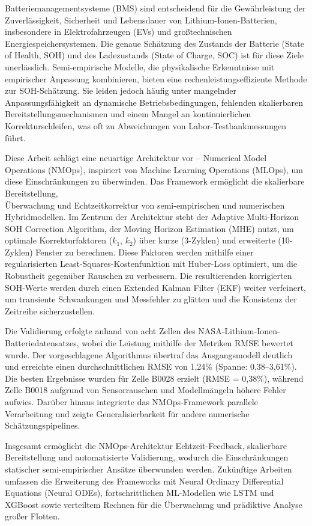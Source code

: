 

Batteriemanagementsysteme (BMS) sind entscheidend für die Gewährleistung der Zuverlässigkeit, Sicherheit und Lebensdauer von Lithium-Ionen-Batterien, insbesondere in Elektrofahrzeugen (EVs) und großtechnischen Energiespeichersystemen. Die genaue Schätzung des Zustands der Batterie (State of Health, SOH) und des Ladezustands (State of Charge, SOC) ist für diese Ziele unerlässlich. Semi-empirische Modelle, die physikalische Erkenntnisse mit empirischer Anpassung kombinieren, bieten eine rechenleistungseffiziente Methode zur SOH-Schätzung. Sie leiden jedoch häufig unter mangelnder Anpassungsfähigkeit an dynamische Betriebsbedingungen, fehlenden skalierbaren Bereitstellungsmechanismen und einem Mangel an kontinuierlichen Korrekturschleifen, was oft zu Abweichungen von Labor-Testbankmessungen führt.

Diese Arbeit schlägt eine neuartige Architektur vor – Numerical Model Operations (NMOps), inspiriert von Machine Learning Operations (MLOps), um diese Einschränkungen zu überwinden. Das Framework ermöglicht die skalierbare Bereitstellung,\\ Überwachung und Echtzeitkorrektur von semi-empirischen und numerischen Hybridmodellen. Im Zentrum der Architektur steht der Adaptive Multi-Horizon SOH Correction Algorithm, der Moving Horizon Estimation (MHE) nutzt, um optimale Korrekturfaktoren ($k_1$, $k_2$) über kurze (3-Zyklen) und erweiterte (10-Zyklen) Fenster zu berechnen. Diese Faktoren werden mithilfe einer regularisierten Least-Squares-Kostenfunktion mit Huber-Loss optimiert, um die Robustheit gegenüber Rauschen zu verbessern. Die resultierenden korrigierten SOH-Werte werden durch einen Extended Kalman Filter (EKF) weiter verfeinert, um transiente Schwankungen und Messfehler zu glätten und die Konsistenz der Zeitreihe sicherzustellen.

Die Validierung erfolgte anhand von acht Zellen des NASA-Lithium-Ionen-\\Batteriedatensatzes, wobei die Leistung mithilfe der Metriken RMSE bewertet wurde. Der vorgeschlagene Algorithmus übertraf das Ausgangsmodell deutlich und erreichte einen durchschnittlichen RMSE von 1,24\% (Spanne: 0,38–3,61\%). Die besten Ergebnisse wurden für Zelle B0028 erzielt (RMSE = 0,38\%), während Zelle B0018 aufgrund von Sensorrauschen und Modellmängeln höhere Fehler aufwies. Darüber hinaus integrierte das NMOps-Framework parallele Verarbeitung und zeigte Generalisierbarkeit für andere numerische Schätzungspipelines.

Insgesamt ermöglicht die NMOps-Architektur Echtzeit-Feedback, skalierbare Bereitstellung und automatisierte Validierung, wodurch die Einschränkungen statischer semi-empirischer Ansätze überwunden werden. Zukünftige Arbeiten umfassen die Erweiterung des Frameworks mit Neural Ordinary Differential Equations (Neural ODEs), fortschrittlichen ML-Modellen wie LSTM und XGBoost sowie verteiltem Rechnen für die Überwachung und prädiktive Analyse großer Flotten.